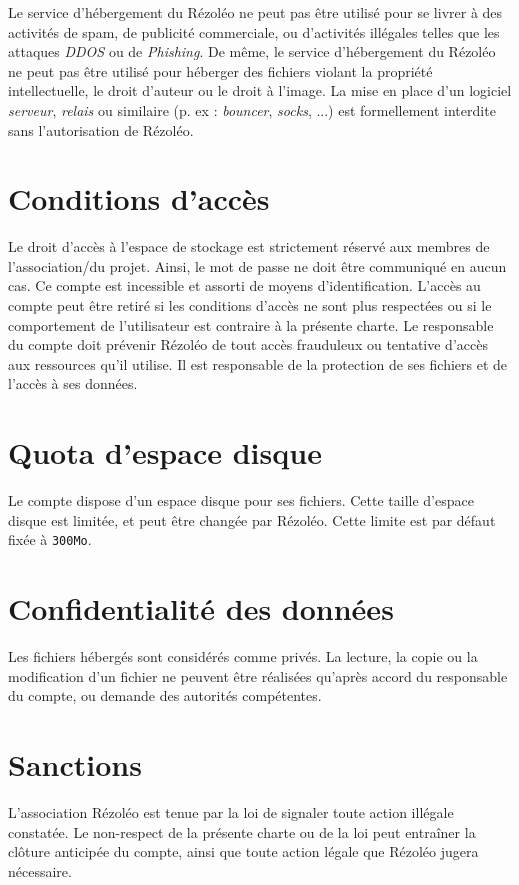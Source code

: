 \documentclass[11pt, a4paper]{article}
\begin{document}
Le service d'hébergement du Rézoléo ne peut pas être utilisé pour se livrer à des activités de spam, de publicité commerciale, ou d'activités illégales telles que les attaques \textit{DDOS} ou de \textit{Phishing}. De même, le service d'hébergement du Rézoléo ne peut pas être utilisé pour héberger des fichiers violant la propriété intellectuelle, le droit d'auteur ou le droit à l'image. La mise en place d'un logiciel \textit{serveur}, \textit{relais} ou similaire (p. ex : \textit{bouncer}, \textit{socks}, ...) est formellement interdite sans l'autorisation de Rézoléo.

\section{Conditions d'accès}
Le droit d'accès à l'espace de stockage est strictement réservé aux membres de l'association/du projet. Ainsi, le mot de passe ne doit être communiqué en aucun cas. Ce compte est incessible et assorti de moyens d'identification. L'accès au compte peut être retiré si les conditions d'accès ne sont plus respectées ou si le comportement de l'utilisateur est contraire à la présente charte. Le responsable du compte doit prévenir Rézoléo de tout accès frauduleux ou tentative d'accès aux ressources qu'il utilise. Il est responsable de la protection de ses fichiers et de l'accès à ses données.

\section{Quota d'espace disque}
Le compte dispose d'un espace disque pour ses fichiers. Cette taille d'espace disque est limitée, et peut être changée par Rézoléo. Cette limite est par défaut fixée à \texttt{300Mo}.

\section{Confidentialité des données}
Les fichiers hébergés sont considérés comme privés. La lecture, la copie ou la modification d'un fichier ne peuvent être réalisées qu'après accord du responsable du compte, ou demande des autorités compétentes.

\section{Sanctions}
L'association Rézoléo est tenue par la loi de signaler toute action illégale constatée. Le non-respect de la présente charte ou de la loi peut entraîner la clôture anticipée du compte, ainsi que toute action légale que Rézoléo jugera nécessaire.
\end{document}
